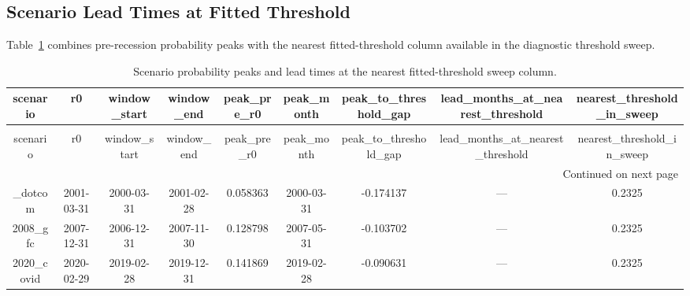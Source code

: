 \documentclass[conference,onecolumn]{IEEEtran}
\begin{document}
\subsection{Scenario Lead Times at Fitted Threshold}
Table~\ref{tab:scenario_leads} combines pre-recession probability peaks with the nearest fitted-threshold column available in the diagnostic threshold sweep.
\begin{longtable}{|c|c|c|c|c|c|c|c|c|}
\caption{Scenario probability peaks and lead times at the nearest fitted-threshold sweep column.} \label{tab:scenario_leads} \\
\toprule
scenario & r0 & window\_start & window\_end & peak\_pre\_r0 & peak\_month & peak\_to\_threshold\_gap & lead\_months\_at\_nearest\_threshold & nearest\_threshold\_in\_sweep \\
\midrule
\endfirsthead
\caption[]{Scenario probability peaks and lead times at the nearest fitted-threshold sweep column.} \\
\toprule
scenario & r0 & window\_start & window\_end & peak\_pre\_r0 & peak\_month & peak\_to\_threshold\_gap & lead\_months\_at\_nearest\_threshold & nearest\_threshold\_in\_sweep \\
\midrule
\endhead
\midrule
\multicolumn{9}{r}{Continued on next page} \\
\midrule
\endfoot
\bottomrule
\endlastfoot
2001\_dotcom & 2001-03-31 & 2000-03-31 & 2001-02-28 & 0.058363 & 2000-03-31 & -0.174137 & --- & 0.2325 \\
2008\_gfc & 2007-12-31 & 2006-12-31 & 2007-11-30 & 0.128798 & 2007-05-31 & -0.103702 & --- & 0.2325 \\
2020\_covid & 2020-02-29 & 2019-02-28 & 2019-12-31 & 0.141869 & 2019-02-28 & -0.090631 & --- & 0.2325 \\
\end{longtable}
\end{document}
